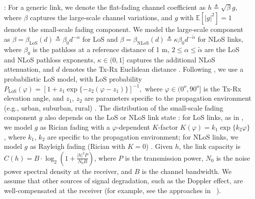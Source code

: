 \documentclass[10pt, twocolumn]{IEEEtran}
\theoremstyle{plain}
\theoremstyle{definition}
\theoremstyle{remark}
\begin{document}
: For a generic link, we denote the flat-fading channel coefficient as $h{\triangleq}\sqrt{\beta}g$, where $\beta$ captures the large-scale channel variations, and $g$ with $\mathbb{E}\left[|g|^2\right]{=}1$ denotes the small-scale fading component. We model the large-scale component as $\beta{=}\beta_{\mathrm{LoS}}(d){\triangleq}\beta_{0}d^{-\alpha}$ for LoS and $\beta{=}\beta_{\mathrm{NLoS}}(d){\triangleq}\kappa\beta_{0}d^{-\tilde{\alpha}}$ for NLoS links, where $\beta_{0}$ is the pathloss at a reference distance of 1 m, $2{\leq}\alpha{\leq}\tilde{\alpha}$ are the LoS and NLoS pathloss exponents, $\kappa{\in}(0,1]$ captures the additional NLoS attenuation, and $d$ denotes the Tx-Rx Euclidean distance \cite{SCA}. Following \cite{LAP}, we use a probabilistic LoS model, with LoS probability
$
	P_{\mathrm{LoS}}(\varphi){=}[ 1{+}z_{1}\exp\{-z_{2}(\varphi{-}z_{1})\}]^{-1},
$
where $\varphi{\in}(0^{o},90^{o}]$ is the Tx-Rx elevation angle, and $z_{1}$, $z_{2}$ are parameters specific to the propagation environment (e.g., urban, suburban, rural) \cite{LAP}. The distribution of the small-scale fading component $g$ also depends on the LoS or NLoS link state \cite{WCBook}: for LoS links, as in \cite{Rician}, we model $g$ as Rician fading with a $\varphi$-dependent $K$-factor $K(\varphi){=}k_{1}\exp\{k_{2}\varphi\}$, where  $k_{1}$, $k_{2}$ are specific to the propagation environment; for NLoS links, we model $g$ as Rayleigh fading (Rician with $K{=}0$) \cite{WCBook}. Given $h$, the link capacity is $C(h){=}B{\cdot}\log_{2}\left(1{+}\frac{|h|^{2}P}{N_{0}B}\right)$, where $P$ is the transmission power, $N_{0}$ is the noise power spectral density at the receiver, and $B$ is the channel bandwidth. We assume that other sources of signal degradation, such as the Doppler effect, are well-compensated at the receiver (for example, see the approaches in ~\cite{Doppler}).
\end{document}
